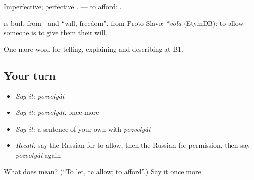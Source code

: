 Imperfective; perfective \emph{}. \emph{ } — to afford: \emph{     }.

\begin{cousinweb}
\textbf{} is built from \emph{-} and \emph{} \textquotedblleft{}will, freedom\textquotedblright{}, from Proto-Slavic \emph{*voľa} (EtymDB): to allow someone is to give them their will.
\end{cousinweb}

\begin{grammarlens}[title={What you've built}]
One more word for telling, explaining and describing at B1.
\end{grammarlens}

\subsection*{Your turn}
\begin{itemize}
\raggedright
  \item \emph{Say it:} \emph{pozvolyát}
  \item \emph{Say it:} \emph{pozvolyát}, once more
  \item \emph{Say it:} a sentence of your own with \emph{pozvolyát}
  \item \emph{Recall:} say the Russian for to allow, then the Russian for permission, then say \emph{pozvolyát} again
\end{itemize}

\begin{tcolorbox}[breakable,colback=teal!4,colframe=teal!35!black,title={Before you move on}]
What does  mean? (\textquotedblleft{}To let, to allow; to afford\textquotedblright{}.) Say it once more.
\end{tcolorbox}
